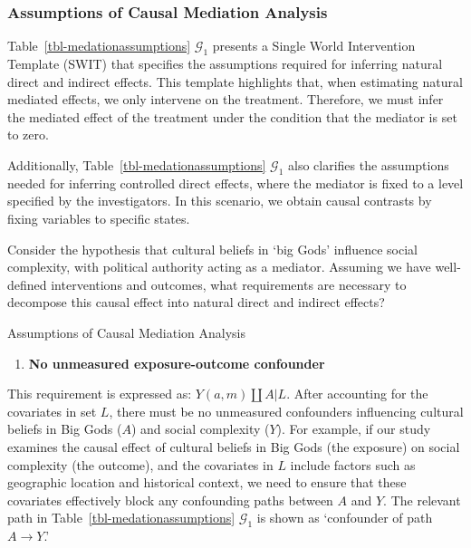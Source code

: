 \documentclass[
  single column]{article}
\providecommand{\tightlist}{%
  \setlength{\itemsep}{0pt}\setlength{\parskip}{0pt}}\usepackage{longtable,booktabs,array}
\begin{document}
\subsubsection{Assumptions of Causal Mediation
Analysis}\label{assumptions-of-causal-mediation-analysis}

Table~\ref{tbl-medationassumptions} \(\mathcal{G}_1\) presents a Single
World Intervention Template (SWIT) that specifies the assumptions
required for inferring natural direct and indirect effects. This
template highlights that, when estimating natural mediated effects, we
only intervene on the treatment. Therefore, we must infer the mediated
effect of the treatment under the condition that the mediator is set to
zero.

Additionally, Table~\ref{tbl-medationassumptions} \(\mathcal{G}_1\) also
clarifies the assumptions needed for inferring controlled direct
effects, where the mediator is fixed to a level specified by the
investigators. In this scenario, we obtain causal contrasts by fixing
variables to specific states.

Consider the hypothesis that cultural beliefs in `big Gods' influence
social complexity, with political authority acting as a mediator.
Assuming we have well-defined interventions and outcomes, what
requirements are necessary to decompose this causal effect into natural
direct and indirect effects?

\begin{table}

\caption{\label{tbl-medationassumptions}Assumptions of Causal Mediation
Analysis}

\centering{

\mediationassumptionsswig

}

\end{table}%

\begin{enumerate}
\def\labelenumi{\arabic{enumi}.}
\tightlist
\item
  \textbf{No unmeasured exposure-outcome confounder}
\end{enumerate}

This requirement is expressed as: \(Y(a,m) \coprod A | L\). After
accounting for the covariates in set \(L\), there must be no unmeasured
confounders influencing cultural beliefs in Big Gods (\(A\)) and social
complexity (\(Y\)). For example, if our study examines the causal effect
of cultural beliefs in Big Gods (the exposure) on social complexity (the
outcome), and the covariates in \(L\) include factors such as geographic
location and historical context, we need to ensure that these covariates
effectively block any confounding paths between \(A\) and \(Y\). The
relevant path in Table~\ref{tbl-medationassumptions} \(\mathcal{G}_1\)
is shown as `confounder of path \(A \to Y\).'
\end{document}
